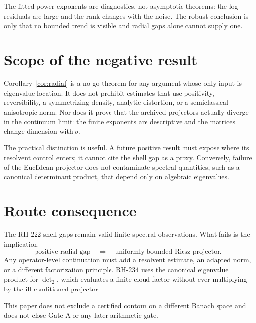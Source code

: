 \documentclass[11pt]{article}
\theoremstyle{remark}
\begin{document}
The fitted power exponents are diagnostics, not asymptotic theorems: the log
residuals are large and the rank changes with the noise.  The robust
conclusion is only that no bounded trend is visible and radial gaps alone
cannot supply one.

\section{Scope of the negative result}

Corollary~\ref{cor:radial} is a no-go theorem for any argument whose only
input is eigenvalue location.  It does not prohibit estimates that use
positivity, reversibility, a symmetrizing density, analytic distortion, or a
semiclassical anisotropic norm.  Nor does it prove that the archived
projectors actually diverge in the continuum limit: the finite exponents are
descriptive and the matrices change dimension with $\sigma$.

The practical distinction is useful.  A future positive result must expose
where its resolvent control enters; it cannot cite the shell gap as a proxy.
Conversely, failure of the Euclidean projector does not contaminate spectral
quantities, such as a canonical determinant product, that depend only on
algebraic eigenvalues.

\section{Route consequence}

The RH-222 shell gaps remain valid finite spectral observations.  What fails
is the implication
\[
 \text{positive radial gap}
 \quad\Longrightarrow\quad
 \text{uniformly bounded Riesz projector}.
\]
Any operator-level continuation must add a resolvent estimate, an adapted
norm, or a different factorization principle.  RH-234 uses the canonical
eigenvalue product for $\det_2$, which evaluates a finite cloud factor without
ever multiplying by the ill-conditioned projector.

This paper does not exclude a certified contour on a different Banach space
and does not close Gate A or any later arithmetic gate.



\end{document}
